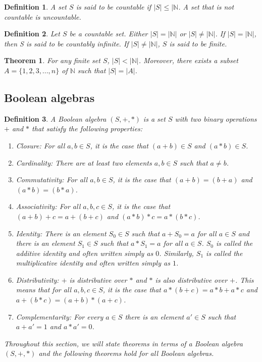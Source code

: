 \documentclass[a4paper]{article}
\newtheorem{mytheorem}{Theorem}
\newtheorem{mydef}{Definition}
\numberwithin{mytheorem}{section}
\numberwithin{mydef}{section}
\numberwithin{axiom}{section}
\numberwithin{example}{section}
\begin{document}
\begin{mydef} A set $S$ is said to be countable if $|S| \leq |\mathbb{N}$. A set that is not countable is uncountable.
\end{mydef}

\begin{mydef}Let $S$ be a countable set. Either $|S| =|\mathbb{N}|$ or $|S| \neq |\mathbb{N}|$. If $|S| =|\mathbb{N}|$, then S is said to be countably infinite. If $|S| \neq |\mathbb{N}|$, $S$ is said to be finite. 
\end{mydef}

\begin{mytheorem} For any finite set $S$, $|S| < |\mathbb{N}|$. Moreover, there exists a subset $A = \{ 1,2,3,...,n\}$ of $\mathbb{N}$ such that $|S| = |A|$.
\end{mytheorem}

\subsection{Boolean algebras}

\begin{mydef}
A Boolean algebra $(S,+,*)$ is a set $S$ with two binary operations $+$ and $*$ that satisfy the following properties:
 \begin{enumerate}
 \item Closure: For all $a,b \in S$, it is the case that $(a+b) \in S$ and $(a * b) \in S$.
 \item Cardinality: There are at least two elements $a,b \in S$ such that $a \neq b$. 
 \item Commutativity: For all $a,b \in S$, it is the case that $(a+b) = (b+a)$ and $(a*b) = (b*a)$.
 \item Associativity: For all $a,b,c \in S$, it is the case that $(a+b)+c = a+(b+c)$ and $(a*b)*c = a*(b*c)$.
 \item Identity: There is an element $S_{0} \in S$ such that $a + S_{0} = a$ for all $a \in S$ and there is an element $S_{1} \in S$ such that $a * S_{1} = a$ for all $a \in S$. $S_{0}$ is called the additive identity and often written simply as $0$. Similarly, $S_{1}$ is called the multiplicative identity and often written simply as $1$. 
 \item Distributivity: $+$ is distributive over $*$ and $*$ is also distributive over $+$. This means that for all $a,b,c \in S$, it is the case that $a*(b+c) = a*b + a*c $ and $a + (b*c) = (a+b)*(a+c)$.
 \item Complementarity: For every $a \in S$ there is an element $a' \in S$ such that $a + a' = 1$ and $a * a' = 0$.
 \end{enumerate}
 
 Throughout this section, we will state theorems in terms of a Boolean algebra $(S,+,*)$ and the following theorems hold for all Boolean algebras.
\end{mydef}
\end{document}
